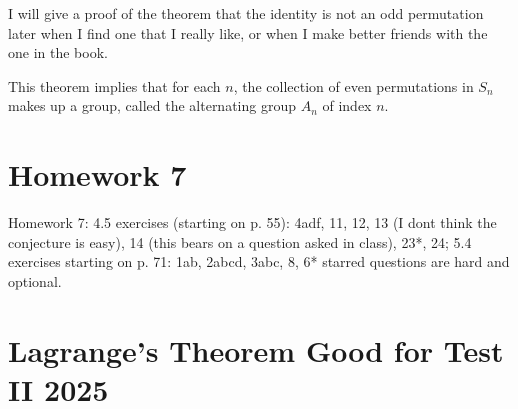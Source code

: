 \documentclass[12pt]{article}
\begin{document}
I will give a proof of the theorem that the identity is not an odd permutation later when I find one that I really like, or when I make better friends with the one in the book.

This theorem implies that for each $n$, the collection of even permutations in $S_n$ makes up a group, called the alternating group $A_n$ of index $n$.



\section{Homework 7}

Homework 7: 4.5 exercises (starting on p. 55): 4adf, 11, 12, 13 (I dont think the conjecture is easy), 14 (this bears on a question asked in class), 23*, 24; 5.4 exercises starting on p. 71: 1ab, 2abcd, 3abc, 8, 6* starred questions are hard and optional. 

\section{Lagrange's Theorem  Good for Test II 2025}
\end{document}
